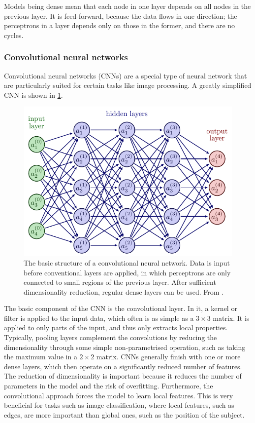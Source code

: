 Models being dense mean that each node in one layer depends on all nodes in the previous layer.
It is feed-forward, because the data flows in one direction; the perceptrons in a layer depends only on those in the former, and there are no cycles.

\subsubsection{Convolutional neural networks}
\label{sec:cnn}
Convolutional neural networks (CNNs) are a special type of neural network that are particularly suited for certain tasks like image processing.
A greatly simplified CNN is shown in \cref{fig:cnn}.

\begin{figure}
    \centering
    \includegraphics[width=0.75\linewidth, page=7]{neural_networks.pdf}
    \caption{
        The basic structure of a convolutional neural network.
        Data is input before conventional layers are applied, in which perceptrons are only connected to small regions of the previous layer.
        After sufficient dimensionality reduction, regular dense layers can be used.
        From \cite{nn_figs}.
    }
    \label{fig:cnn}
\end{figure}

The basic component of the CNN is the convolutional layer.
In it, a kernel or filter is applied to the input data, which often is as simple as a $3 \times 3$ matrix.
It is applied to only parts of the input, and thus only extracts local properties.
Typically, pooling layers complement the convolutions by reducing the dimensionality through some simple non-parametrised operation, such as taking the maximum value in a $2 \times 2$ matrix.
CNNs generally finish with one or more dense layers, which then operate on a significantly reduced number of features.
The reduction of dimensionality is important because it reduces the number of parameters in the model and the risk of overfitting.
Furthermore, the convolutional approach forces the model to learn local features.
This is very beneficial for tasks such as image classification, where local features, such as edges, are more important than global ones, such as the position of the subject.

